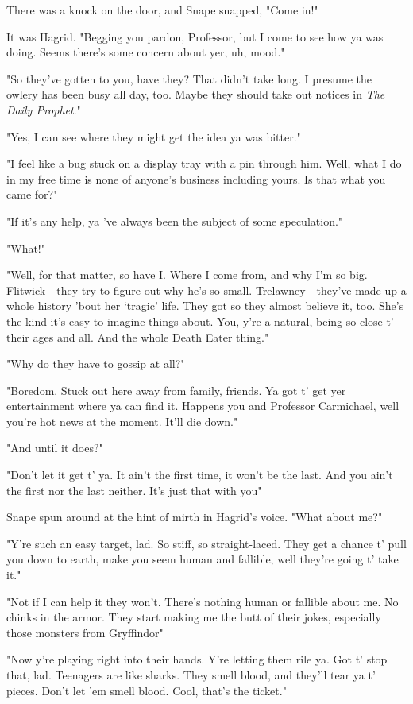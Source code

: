 There was a knock on the door, and Snape snapped, "Come in!"

It was Hagrid. "Begging you pardon, Professor, but I come to see how ya was doing. Seems there's some concern about yer, uh, mood."

"So they've gotten to you, have they? That didn't take long. I presume the owlery has been busy all day, too. Maybe they should take out notices in \emph{The Daily Prophet}."

"Yes, I can see where they might get the idea ya was bitter."

"I feel like a bug stuck on a display tray with a pin through him. Well, what I do in my free time is none of anyone's business including yours. Is that what you came for?"

"If it's any help, ya 've always been the subject of some speculation."

"What!"

"Well, for that matter, so have I. Where I come from, and why I'm so big. Flitwick - they try to figure out why he's so small. Trelawney - they've made up a whole history 'bout her `tragic' life. They got so they almost believe it, too. She's the kind it's easy to imagine things about. You, y're a natural, being so close t' their ages and all. And the whole Death Eater thing."

"Why do they have to gossip at all?"

"Boredom. Stuck out here away from family, friends. Ya got t' get yer entertainment where ya can find it. Happens you and Professor Carmichael, well you're hot news at the moment. It'll die down."

"And until it does?"

"Don't let it get t' ya. It ain't the first time, it won't be the last. And you ain't the first nor the last neither. It's just that with you{\el}"

Snape spun around at the hint of mirth in Hagrid's voice. "What about me?"

"Y're such an easy target, lad. So stiff, so straight-laced. They get a chance t' pull you down to earth, make you seem human and fallible, well they're going t' take it."

"Not if I can help it they won't. There's nothing human or fallible about me. No chinks in the armor. They start making me the butt of their jokes, especially those monsters from Gryffindor{\el}"

"Now y're playing right into their hands. Y're letting them rile ya. Got t' stop that, lad. Teenagers are like sharks. They smell blood, and they'll tear ya t' pieces. Don't let 'em smell blood. Cool, that's the ticket."

